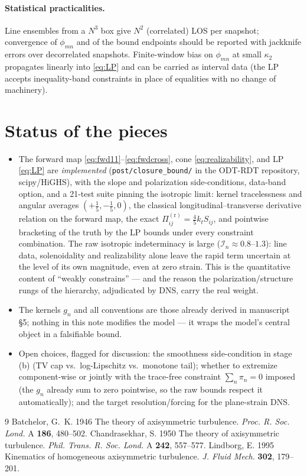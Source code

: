 \documentclass[11pt,a4paper]{article}
\newcommand{\Pir}[1]{\Pi^{(\mathrm r)}_{#1}}
\begin{document}
\paragraph{Statistical practicalities.} Line ensembles from a $N^3$ box give
$N^2$ (correlated) LOS per snapshot; convergence of $\phi_{mn}$ and of the
bound endpoints should be reported with jackknife errors over decorrelated
snapshots. Finite-window bias on $\phi_{mn}$ at small $\kappa_2$ propagates
linearly into \eqref{eq:LP} and can be carried as interval data (the LP
accepts inequality-band constraints in place of equalities with no change of
machinery).

\section{Status of the pieces}
\begin{itemize}[leftmargin=2em]
\item The forward map \eqref{eq:fwd11}--\eqref{eq:fwdcross}, cone
  \eqref{eq:realizability}, and LP \eqref{eq:LP} are \emph{implemented}
  (\texttt{post/closure\_bound/} in the ODT-RDT repository, scipy/HiGHS),
  with the slope and polarization side-conditions, data-band option, and a
  21-test suite pinning the isotropic limit: kernel tracelessness and
  angular averages $(+\tfrac15,-\tfrac15,0)$, the classical
  longitudinal--transverse derivative relation on the forward map, the exact
  $\Pir{ij}=\tfrac45 k_t S_{ij}$, and pointwise bracketing of the truth by
  the LP bounds under every constraint combination. The raw isotropic
  indeterminacy is large ($\mathcal I_n\approx0.8$--$1.3$): line data,
  solenoidality and realizability alone leave the rapid term uncertain at
  the level of its own magnitude, even at zero strain. This is the
  quantitative content of ``weakly constrains'' --- and the reason the
  polarization/structure rungs of the hierarchy, adjudicated by DNS, carry
  the real weight.
\item The kernels $g_n$ and all conventions are those already derived in
  manuscript \S5; nothing in this note modifies the model --- it wraps the
  model's central object in a falsifiable bound.
\item Open choices, flagged for discussion: the smoothness side-condition in
  stage (b) (TV cap vs.\ log-Lipschitz vs.\ monotone tail); whether to
  extremize component-wise or jointly with the trace-free constraint
  $\sum_n\pi_n=0$ imposed (the $g_n$ already sum to zero pointwise, so the
  raw bounds respect it automatically); and the target resolution/forcing for
  the plane-strain DNS.
\end{itemize}

\begin{thebibliography}{9}\small
{}
Batchelor, G.~K. 1946 The theory of axisymmetric turbulence.
\emph{Proc. R. Soc. Lond.} A \textbf{186}, 480--502.
Chandrasekhar, S. 1950 The theory of axisymmetric turbulence.
\emph{Phil. Trans. R. Soc. Lond.} A \textbf{242}, 557--577.
Lindborg, E. 1995 Kinematics of homogeneous axisymmetric turbulence.
\emph{J. Fluid Mech.} \textbf{302}, 179--201.
\end{thebibliography}
\end{document}
